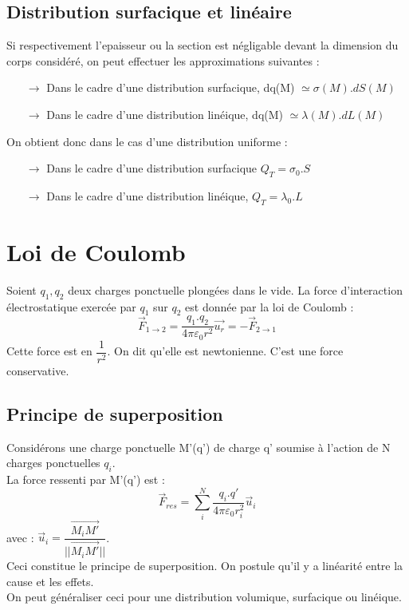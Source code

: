 \subsection{Distribution surfacique et linéaire}
Si respectivement l'epaisseur ou la section est négligable devant la dimension du corps considéré, on peut effectuer les approximations suivantes : 
\begin{itemize}
 \item[$\rightarrow$] Dans le cadre d'une distribution surfacique, dq(M) $\simeq \sigma(M).dS(M)$
 \item[$\rightarrow$] Dans le cadre d'une distribution linéique, dq(M) $\simeq \lambda(M).dL(M)$
\end{itemize}
On obtient donc dans le cas d'une distribution uniforme : 
\begin{itemize}
 \item[$\rightarrow$] Dans le cadre d'une distribution surfacique $Q_T = \sigma_0.S$
 \item[$\rightarrow$] Dans le cadre d'une distribution linéique, $Q_T = \lambda_0.L$
\end{itemize}
\section{Loi de Coulomb}
\begin{de}
Soient $q_1,q_2$ deux charges ponctuelle plongées dans le vide. La force d'interaction électrostatique exercée par $q_1$ sur $q_2$ est donnée par la loi de Coulomb : 
$$\overrightarrow{F}_{1 \rightarrow 2} = \dfrac{q_1.q_2}{4\pi \varepsilon_0 r^2} \overrightarrow{u_r} = -\overrightarrow{F}_{2 \rightarrow 1}$$
Cette force est en $\dfrac{1}{r^2}$. On dit qu'elle est newtonienne. C'est une force conservative.
\end{de}
\subsection{Principe de superposition}
Considérons une charge ponctuelle M'(q') de charge q' soumise à l'action de N charges ponctuelles $q_i$.\\
La force ressenti par M'(q') est : 
$$\overrightarrow{F}_{res} = \sum_i^N \dfrac{q_i.q'}{4\pi\varepsilon_0r_i^2}\overrightarrow{u}_i$$
avec : $\overrightarrow{u}_i = \dfrac{\overrightarrow{M_iM'}}{||\overrightarrow{M_iM'}||}$.\\
Ceci constitue le principe de superposition. On postule qu'il y a linéarité entre la cause et les effets.\\
On peut généraliser ceci pour une distribution volumique, surfacique ou linéique.
